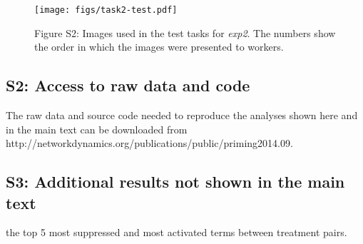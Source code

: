 \documentclass[12pt]{article}
\begin{document}
\begin{figure}
	\texttt{[image: figs/task2-test.pdf]}
	\label{fig:task2:test}
	\caption{
		Figure S2: Images used in the test tasks for 
		\textit{exp2}.  The numbers show the order in which the 
		images were presented to workers.
	}
\end{figure}

\subsection*{S2: Access to raw data and code}
The raw data and source code needed to reproduce the analyses 
shown here and in the main text can be downloaded from 
http://networkdynamics.org/publications/public/priming2014.09.

\subsection*{S3: Additional results not shown in the main text}
		the top 5 most suppressed and most activated terms between treatment
		pairs.
\end{document}

